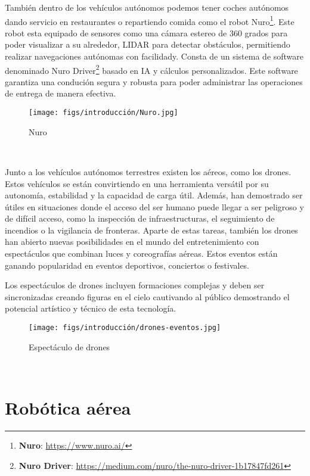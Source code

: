 También dentro de los vehículos autónomos podemos tener coches autónomos dando servicio en restaurantes o repartiendo comida como el robot Nuro\footnote{\textbf{Nuro}: \url{https://www.nuro.ai/}}. 
Este robot esta equipado de sensores como una cámara estereo de 360 grados para poder visualizar a su alrededor, LIDAR para detectar obstáculos, permitiendo realizar
navegaciones autónomas con facilidady. Consta de un sistema de software denominado Nuro Driver\footnote{\textbf{Nuro Driver}: \url{https://medium.com/nuro/the-nuro-driver-1b17847fd261}} 
basado en IA y cálculos personalizados. Este software garantiza una condución segura y robusta para poder administrar las operaciones de entrega de manera efectiva. 

\begin{figure} [H]
  \begin{center}
    \texttt{[image: figs/introducción/Nuro.jpg]}
  \end{center}
  \caption{Nuro}
  \label{fig:Nuro}
\end{figure}\

Junto a los vehículos autónomos terrestres existen los aéreos, como los drones. Estos vehículos se están
convirtiendo en una herramienta versátil por su autonomía, estabilidad y la capacidad de carga útil. Además, han demostrado ser útiles en situaciones donde
el acceso del ser humano puede llegar a ser peligroso y de difícil acceso, como la inspección de infraestructuras, el seguimiento de incendios o la vigilancia
de fronteras. Aparte de estas tareas, también los drones han abierto nuevas posibilidades en el mundo del entretenimiento con espectáculos que combinan
luces y coreografías aéreas. Estos eventos están ganando popularidad en eventos deportivos, conciertos o festivales. 

Los espectáculos de drones incluyen formaciones complejas y deben ser sincronizadas creando figuras en el cielo cautivando al público demostrando el potencial
artístico y técnico de esta tecnología. 

\begin{figure} [H]
  \begin{center}
    \texttt{[image: figs/introducción/drones-eventos.jpg]}
  \end{center}
  \caption{Espectáculo de drones}
  \label{fig:Espectáculo de drones}
\end{figure}\


\newpage
\section{Robótica aérea}
\label{sec:robotica aerea} %

